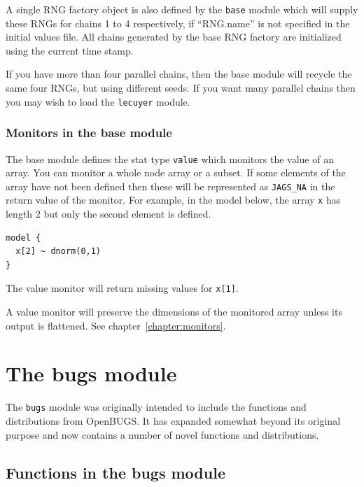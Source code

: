 \documentclass[11pt, a4paper, titlepage]{report}
\newcommand{\OpenBUGS}{\textsf{OpenBUGS}}
\begin{document}
A single RNG factory object is also defined by the \texttt{base}
module which will supply these RNGs for chains 1 to 4 respectively, if
``RNG.name'' is not specified in the initial values file.  All chains
generated by the base RNG factory are initialized using the current
time stamp.

If you have more than four parallel chains, then the base module will
recycle the same four RNGs, but using different seeds. If you want
many parallel chains then you may wish to load the \verb+lecuyer+
module.


\subsection{Monitors in the base module}
\label{section:base:monitors}

The base module defines the stat type \texttt{value} which monitors
the value of an array. You can monitor a whole node array or a
subset. If some elements of the array have not been defined then these
will be represented as \texttt{JAGS\_NA} in the return value of the
monitor. For example, in the model below, the array \texttt{x} has
length 2 but only the second element is defined.

\begin{verbatim}
model {
  x[2] ~ dnorm(0,1)
}
\end{verbatim}

The value monitor will return missing values for \texttt{x[1]}.

A value monitor will preserve the dimensions of the monitored array
unless its output is flattened. See chapter~\ref{chapter:monitors}.

\chapter{The bugs module}
\label{chapter:bugsmod}

The \texttt{bugs} module was originally intended to include the
functions and distributions from \OpenBUGS. It has expanded somewhat
beyond its original purpose and now contains a number of novel
functions and distributions.

\section{Functions in the bugs module}
\label{section:bugs:functions}
\end{document}
